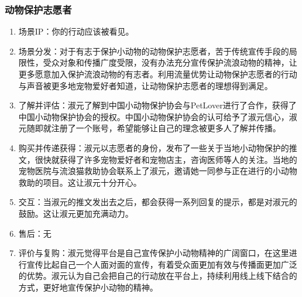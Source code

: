 \documentclass[a4paper]{ctexart}
\begin{document}
\subsubsection{动物保护志愿者}
\begin{enumerate}[label=\alph*.]
  \item 场景IP：你的行动应该被看见。
  \item 场景分发：对于有志于保护小动物的动物保护志愿者，苦于传统宣传手段的局限性，受众对象和传播广度受限，没有办法充分宣传保护流浪动物的精神，让更多愿意加入保护流浪动物的有志者。利用流量优势让动物保护志愿者的行动与声音被更多地宠物爱好者知道，让动物保护志愿者的理想得到满足。
  \item 了解并评估：淑元了解到中国小动物保护协会与PetLover进行了合作，获得了中国小动物保护协会的授权。中国小动物保护协会的认可给予了淑元信心，淑元随即就注册了一个账号，希望能够让自己的理念被更多人了解并传播。
  \item 购买并传递获得：淑元以志愿者的身份，发布了一些关于当地小动物保护的推文，很快就获得了许多宠物爱好者和宠物店主，咨询医师等人的关注。当地的宠物医院与流浪猫救助协会联系上了淑元，邀请她一同参与正在进行的小动物救助的项目。这让淑元十分开心。
  \item 交互：当淑元的推文发出去之后，都会获得一系列回复的提示，都是对淑元的鼓励。这让淑元更加充满动力。
  \item 售后：无
  \item 评价与复购：淑元觉得平台是自己宣传保护小动物精神的广阔窗口，在这里进行宣传比起自己一个人面对面的宣传，有着受众面更加有效与传播面更加广泛的优势。淑元认为自己会把自己的行动放在平台上，持续利用线上线下结合的方式，更好地宣传保护小动物的精神。
\end{enumerate}
\end{document}
